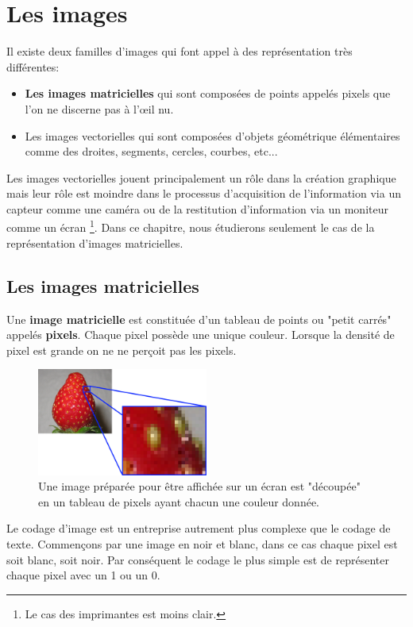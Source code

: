 \section{Les images}
Il existe deux familles d'images qui font appel à des représentation très différentes:
\begin{itemize}
	\item \textbf{Les images matricielles} qui sont composées de points appelés pixels que l’on ne discerne pas à l'œil nu. 
	\item Les images vectorielles qui sont composées d'objets géométrique élémentaires comme des droites, segments, cercles, courbes,  etc...
\end{itemize}
Les images vectorielles jouent principalement un rôle dans la création graphique mais leur rôle est moindre dans le processus d'acquisition de l'information via un capteur comme une caméra ou de la restitution d'information via un moniteur comme un écran \footnote{Le cas des imprimantes est moins clair.}. Dans ce chapitre, nous étudierons seulement le cas de la représentation d'images matricielles. 

\subsection{Les images matricielles}
Une \textbf{image matricielle} est constituée d'un tableau de points ou "petit carrés" appelés \textbf{pixels}. Chaque pixel possède une unique couleur. Lorsque la densité de pixel est grande on ne ne perçoit pas les pixels. 
\begin{figure}[h!]
	\centering
	\includegraphics[trim=10 0 0 20,width=0.5\textwidth]{Images/codage_information/Zoom_sur_une_image}
	\caption{Une image préparée pour être affichée sur un écran est "découpée" en un tableau de pixels ayant chacun une couleur donnée.}
\end{figure}
Le codage d'image est un entreprise autrement plus complexe que le codage de texte. Commençons par une image en noir et blanc, dans ce cas chaque pixel est soit blanc, soit noir. Par conséquent le codage le plus simple est de représenter chaque pixel avec un 1 ou un 0. 

